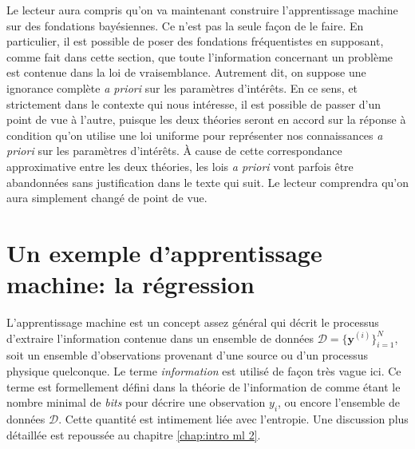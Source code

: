 Le lecteur aura compris qu'on va maintenant construire l'apprentissage machine sur des fondations bayésiennes. Ce n'est pas la seule façon de le 
faire. En particulier, il est possible de poser des fondations fréquentistes en supposant, comme fait dans cette section, que toute l'information 
concernant un problème est contenue dans la loi de vraisemblance. Autrement dit, on suppose une ignorance complète \textit{a priori} sur les paramètres d'intérêts. 
En ce sens, et strictement dans le contexte qui nous intéresse, il est possible de passer d'un point de vue à l'autre, puisque les deux théories seront en accord 
sur la réponse à condition qu'on utilise une loi uniforme pour représenter nos connaissances \textit{a priori} sur les paramètres d'intérêts. 
À cause de cette correspondance approximative entre les deux théories, les lois 
\textit{a priori} vont parfois être abandonnées sans justification dans le texte qui suit. 
Le lecteur comprendra qu'on aura simplement changé de point de vue. 

\section{Un exemple d'apprentissage machine: la régression}\label{sec:app classique}

L'apprentissage machine est un concept assez général qui décrit le processus d'extraire l'information contenue 
dans un ensemble de données $\mathcal{D} = \{\mathbf{y}^{(i)}\}_{i=1}^{N}$, soit un ensemble d'observations provenant d'une source ou d'un processus 
physique quelconque. Le terme \textit{information} est utilisé de façon très vague ici. Ce terme est formellement défini dans la théorie 
de l'information de \citet{Shannon1948} comme étant le nombre minimal de \textit{bits} pour décrire une observation $y_i$, ou encore 
l'ensemble de données $\mathcal{D}$. Cette quantité est intimement liée avec l'entropie. Une discussion plus détaillée est 
repoussée au chapitre \ref{chap:intro ml 2}.

